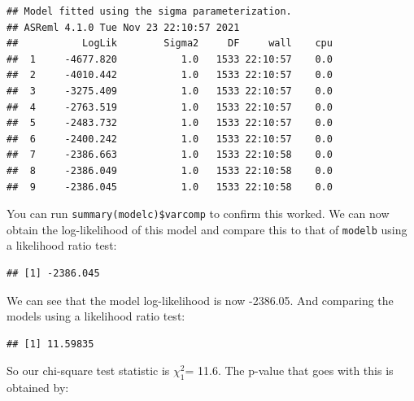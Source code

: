 \documentclass[
  12pt,
]{book}
\newenvironment{Shaded}{\begin{snugshade}}{\end{snugshade}}
\newcommand{\DecValTok}[1]{\textcolor[rgb]{0.00,0.00,0.81}{#1}}
\newcommand{\KeywordTok}[1]{\textcolor[rgb]{0.13,0.29,0.53}{\textbf{#1}}}
\newcommand{\NormalTok}[1]{#1}
\newcommand{\OperatorTok}[1]{\textcolor[rgb]{0.81,0.36,0.00}{\textbf{#1}}}
\newcommand{\StringTok}[1]{\textcolor[rgb]{0.31,0.60,0.02}{#1}}
\begin{document}
\begin{verbatim}
## Model fitted using the sigma parameterization.
## ASReml 4.1.0 Tue Nov 23 22:10:57 2021
##           LogLik        Sigma2     DF     wall    cpu
##  1     -4677.820           1.0   1533 22:10:57    0.0
##  2     -4010.442           1.0   1533 22:10:57    0.0
##  3     -3275.409           1.0   1533 22:10:57    0.0
##  4     -2763.519           1.0   1533 22:10:57    0.0
##  5     -2483.732           1.0   1533 22:10:57    0.0
##  6     -2400.242           1.0   1533 22:10:57    0.0
##  7     -2386.663           1.0   1533 22:10:58    0.0
##  8     -2386.049           1.0   1533 22:10:58    0.0
##  9     -2386.045           1.0   1533 22:10:58    0.0
\end{verbatim}

You can run \texttt{summary(modelc)\$varcomp} to confirm this worked. We can now obtain the log-likelihood of this model and compare this to that of \texttt{modelb} using a likelihood ratio test:

\begin{Shaded}
\end{Shaded}

\begin{verbatim}
## [1] -2386.045
\end{verbatim}

We can see that the model log-likelihood is now -2386.05.
And comparing the models using a likelihood ratio test:

\begin{Shaded}
\end{Shaded}

\begin{verbatim}
## [1] 11.59835
\end{verbatim}

So our chi-square test statistic is \(\chi^2_1\)= 11.6.
The p-value that goes with this is obtained by:

\begin{Shaded}
\end{Shaded}
\end{document}
